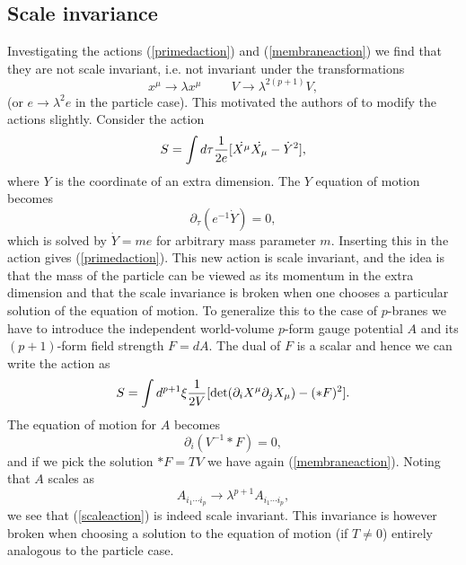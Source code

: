 \subsection{Scale invariance}
Investigating the actions (\ref{primedaction}) and (\ref{membraneaction}) we find that they are not scale invariant, i.e. not invariant under the transformations
\begin{equation}
x^{\mu} \rightarrow \lambda x^{\mu} \hspace{1cm} V \rightarrow \lambda^{2(p+1)}V,
\end{equation}
(or $e \rightarrow \lambda^2 e$ in the particle case). This motivated the authors of \cite{valskriven} to modify the actions slightly. Consider the action
\begin{equation}
S=\int d\tau {1 \over 2e}[\dot{X^{\mu}}\dot{X_{\mu}} - \dot{Y}^2],
\end{equation}
where $Y$ is the coordinate of an extra dimension. The $Y$ equation of motion becomes
\begin{equation}
\partial_{\tau}(e^{-1}\dot{Y})=0,
\end{equation}
which is solved by $\dot{Y} = me$ for arbitrary mass parameter $m$. Inserting this in the action gives (\ref{primedaction}). 
This new action is scale invariant, and the idea is that the mass of the particle can be viewed as its momentum in the extra dimension and that the scale invariance is broken when one chooses a particular solution of the equation of motion. 
To generalize this to the case of $p$-branes we have to introduce the independent world-volume $p$-form gauge potential $A$ and its $(p+1)$-form field strength $F = dA$.
The dual of $F$ is a scalar and hence we can write the action as
\begin{equation}
S=\int d^{p+1} \xi {1 \over 2V}[\mbox{det}(\partial_i X^{\mu} \partial_j X_{\mu})-(*F)^2].
\label{scaleaction}
\end{equation}
The equation of motion for $A$ becomes
\begin{equation}
\partial_{i}(V^{-1}*F)=0,
\end{equation}
and if we pick the solution $*F=TV$ we have again (\ref{membraneaction}). Noting that $A$ scales as
\begin{equation}
A_{i_1 \cdots i_p} \rightarrow \lambda^{p+1} A_{i_1 \cdots i_p},
\end{equation}
we see that (\ref{scaleaction}) is indeed scale invariant. This invariance is however broken when choosing a solution to the equation of motion (if $T \neq 0$) 
entirely analogous to the particle case.

